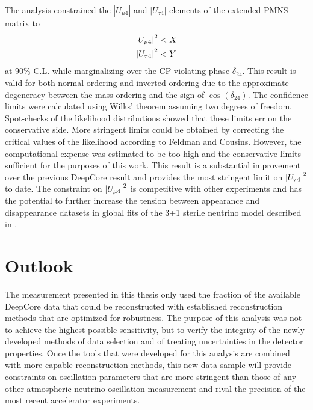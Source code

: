The analysis constrained the $|U_{\mu4}|$ and $|U_{\tau4}|$ elements of the extended PMNS matrix to
\begin{equation}
    \begin{aligned}
        \abs{U_{\mu4}}^2 &< X \\
        \abs{U_{\tau4}}^2 &< Y \\
    \end{aligned}
\end{equation}
at 90\% C.L. while marginalizing over the CP violating phase $\delta_{24}$. This result is valid for both normal ordering and inverted ordering due to the approximate degeneracy between the mass ordering and the sign of $\cos(\delta_{24})$. The confidence limits were calculated using Wilks' theorem assuming two degrees of freedom. Spot-checks of the likelihood distributions showed that these limits err on the conservative side. More stringent limits could be obtained by correcting the critical values of the likelihood according to Feldman and Cousins\cite{Feldman_1998}. However, the computational expense was estimated to be too high and the conservative limits sufficient for the purposes of this work. This result is a substantial improvement over the previous DeepCore result and provides the most stringent limit on $\abs{U_{\tau4}}^2$ to date. The constraint on $\abs{U_{\mu4}}^2$ is competitive with other experiments and has the potential to further increase the tension between appearance and disappearance datasets in global fits of the 3+1 sterile neutrino model described in .

\section{Outlook}

The measurement presented in this thesis only used the fraction of the available DeepCore data that could be reconstructed with established reconstruction methods that are optimized for robustness. The purpose of this analysis was not to achieve the highest possible sensitivity, but to verify the integrity of the newly developed methods of data selection and of treating uncertainties in the detector properties. Once the tools that were developed for this analysis are combined with more capable reconstruction methods, this new data sample will provide constraints on oscillation parameters that are more stringent than those of any other atmospheric neutrino oscillation measurement and rival the precision of the most recent accelerator experiments.

